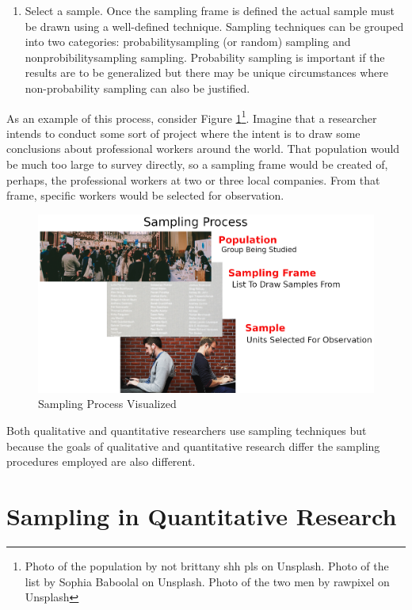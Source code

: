 \begin{enumerate}
	\item Select a sample. Once the sampling frame is defined the actual sample must be drawn using a well-defined technique. Sampling techniques can be grouped into two categories: \gls{probabilitysampling} (or random) sampling and \gls{nonprobibilitysampling} sampling. Probability sampling is important if the results are to be generalized but there may be unique circumstances where non-probability sampling can also be justified.

\end{enumerate}

As an example of this process, consider Figure \ref{07:fig11}\footnote{Photo of the population by not brittany shh pls on Unsplash. Photo of the list by Sophia Baboolal on Unsplash. Photo of the two men by rawpixel on Unsplash}. Imagine that a researcher intends to conduct some sort of project where the intent is to draw some conclusions about professional workers around the world. That population would be much too large to survey directly, so a sampling frame would be created of, perhaps, the professional workers at two or three local companies. From that frame, specific workers would be selected for observation.

\begin{figure}[H]
	\centering
	\includegraphics[width=\maxwidth{.95\linewidth}]{gfx/07-11}
	\caption{Sampling Process Visualized}
	\label{07:fig11}
\end{figure}

Both qualitative and quantitative researchers use sampling techniques but because the goals of qualitative and quantitative research differ the sampling procedures employed are also different.

\section{Sampling in Quantitative Research}

